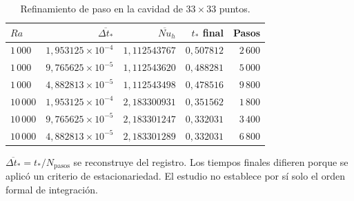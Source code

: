 \begin{table}[htbp]
\centering
\caption{Refinamiento de paso en la cavidad de $33\times33$ puntos.}
\label{tab:res_cavidad_temporal}
\small
\setlength{\tabcolsep}{5pt}
\begin{tabular}{lrrrr}
\toprule
$Ra$ & $\overline{\Delta t_*}$ & $\overline{Nu}_h$ & $t_*$ final & Pasos \\
\midrule
$1\,000$ & $1{,}953125\times10^{-4}$ & $1{,}112543767$ & $0{,}507812$ & $2\,600$ \\
$1\,000$ & $9{,}765625\times10^{-5}$ & $1{,}112543620$ & $0{,}488281$ & $5\,000$ \\
$1\,000$ & $4{,}882813\times10^{-5}$ & $1{,}112543498$ & $0{,}478516$ & $9\,800$ \\
$10\,000$ & $1{,}953125\times10^{-4}$ & $2{,}183300931$ & $0{,}351562$ & $1\,800$ \\
$10\,000$ & $9{,}765625\times10^{-5}$ & $2{,}183301247$ & $0{,}332031$ & $3\,400$ \\
$10\,000$ & $4{,}882813\times10^{-5}$ & $2{,}183301289$ & $0{,}332031$ & $6\,800$ \\
\bottomrule
\end{tabular}
\par\vspace{3pt}
\begin{minipage}{0.98\textwidth}\footnotesize
$\overline{\Delta t_*}=t_*/N_{\mathrm{pasos}}$ se reconstruye del registro. Los tiempos finales difieren porque se aplicó un criterio de estacionariedad. El estudio no establece por sí solo el orden formal de integración.
\end{minipage}
\end{table}
